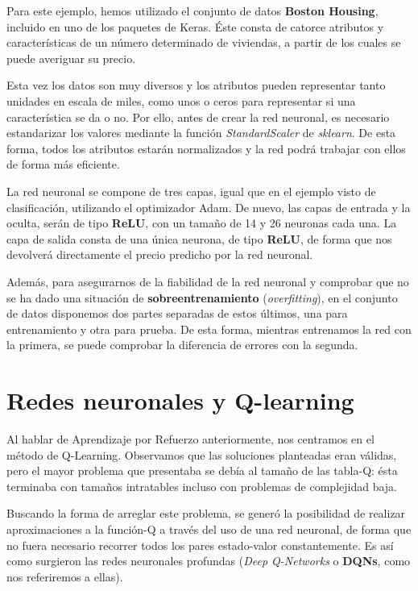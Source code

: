 Para este ejemplo, hemos utilizado el conjunto de datos \textbf{Boston Housing}, incluido en uno de los paquetes de Keras. Éste consta de catorce atributos y características de un número determinado de viviendas, a partir de los cuales se puede averiguar su precio. 

Esta vez los datos son muy diversos y los atributos pueden representar tanto unidades en escala de miles, como unos o ceros para representar si una característica se da o no. Por ello, antes de crear la red neuronal, es necesario estandarizar los valores mediante la función \textit{StandardScaler} de \textit{sklearn}. De esta forma, todos los atributos estarán normalizados y la red podrá trabajar con ellos de forma más eficiente.

La red neuronal se compone de tres capas, igual que en el ejemplo visto de clasificación, utilizando el optimizador Adam. De nuevo, las capas de entrada y la oculta, serán de tipo \textbf{ReLU}, con un tamaño de 14 y 26 neuronas cada una. La capa de salida consta de una única neurona, de tipo \textbf{ReLU}, de forma que nos devolverá directamente el precio predicho por la red neuronal. 

Además, para asegurarnos de la fiabilidad de la red neuronal y comprobar que no se ha dado una situación de \textbf{sobreentrenamiento} (\textit{overfitting}), en el conjunto de datos disponemos dos partes separadas de estos últimos, una para entrenamiento y otra para prueba. De esta forma, mientras entrenamos la red con la primera, se puede comprobar la diferencia de errores con la segunda. 


\section{Redes neuronales y Q-learning}

Al hablar de Aprendizaje por Refuerzo anteriormente, nos centramos en el método de Q-Learning. Observamos que las soluciones planteadas eran válidas, pero el mayor problema que presentaba se debía al tamaño de las tabla-Q: ésta terminaba con tamaños intratables incluso con problemas de complejidad baja. 

Buscando la forma de arreglar este problema, se generó la posibilidad de realizar aproximaciones a la función-Q a través del uso de una red neuronal, de forma que no fuera necesario recorrer todos los pares estado-valor constantemente. Es así como surgieron las redes neuronales profundas (\textit{Deep Q-Networks} o \textbf{DQNs}, como nos referiremos a ellas). 

